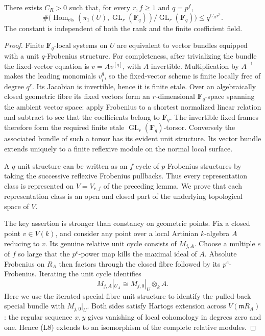 \begin{theorem}
\label{D:uniform-local-representation-growth}
There exists \(C_R>0\) such that, for every \(r,f\geq1\) and \(q=p^f\),
\[
 \#\bigl(
 \operatorname{Hom}_{\mathrm{cts}}(\pi_1(U),\operatorname{GL}_r(\mathbf F_q))
                  /\operatorname{GL}_r(\mathbf F_q)\bigr)
       \leq q^{C_Rr^2}.
 \tag{L7}
\]
The constant is independent of both the rank and the finite coefficient
field.
\end{theorem}

\begin{proof}
Finite \(\mathbf F_q\)-local systems on \(U\) are equivalent to
vector bundles equipped with a unit \(q\)-Frobenius structure.
For completeness, after trivializing the bundle the fixed-vector
equation is \(v=A v^{[q]}\), with \(A\) invertible. Multiplication
by \(A^{-1}\) makes the leading monomials \(v_i^q\), so the
fixed-vector scheme is finite locally free of degree \(q^r\).
Its Jacobian is invertible, hence it is finite etale.
Over an algebraically closed geometric fibre its fixed vectors
form an \(r\)-dimensional \(\mathbf F_q\)-space spanning the
ambient vector space: apply Frobenius to a shortest normalized
linear relation and subtract to see that the coefficients belong
to \(\mathbf F_q\). The invertible fixed frames therefore form
the required finite etale \(\operatorname{GL}_r(\mathbf F_q)\)-torsor.
Conversely the associated bundle of such a torsor has its evident
unit structure. Its vector bundle extends uniquely to a finite
reflexive module on the normal local surface.

A \(q\)-unit structure can be written as an \(f\)-cycle of
\(p\)-Frobenius structures by taking the successive reflexive
Frobenius pullbacks. Thus every representation class is represented
on \(V=V_{r,f}\) of the preceding lemma.
We prove that each representation class is an open and closed
part of the underlying topological space of \(V\).

The key assertion is stronger than constancy on geometric points.
Fix a closed point \(v\in V(k)\), and consider any point over a
local Artinian \(k\)-algebra \(A\) reducing to \(v\).
Its genuine relative unit cycle consists of \(M_{j,A}\).
Choose a multiple \(e\) of \(f\) so large that the \(p^e\)-power
map kills the maximal ideal of \(A\).
Absolute Frobenius on \(R_A\) then factors through the closed
fibre followed by its \(p^e\)-Frobenius.
Iterating the unit cycle identifies
\[
 M_{j,A}|_{U_A}\cong M_{j,0}|_U\otimes_k A.
 \tag{L8}
\]
Here we use the iterated special-fibre unit structure to identify
the pulled-back special bundle with \(M_{j,0}|_U\).
Both sides satisfy Hartogs extension across \(V(\mathfrak m R_A)\):
the regular sequence \(x,y\) gives vanishing of local cohomology
in degrees zero and one. Hence (L8) extends to an isomorphism
of the complete relative modules.


\end{proof}
